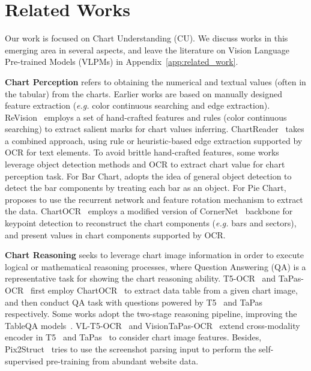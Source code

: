 \documentclass{article} \usepackage{iclr2024_conference,times}
\begin{document}
\vspace{-8pt}
\section{Related Works}
\vspace{-8pt}
Our work is focused on Chart Understanding (CU). We discuss works in this emerging area in several aspects, and leave the literature on Vision Language Pre-trained Models (VLPMs) in Appendix~\ref{app:related_work}.  

\textbf{Chart Perception} refers to obtaining the numerical and textual values (often in the tabular) from the charts. Earlier works are based on manually designed feature extraction (\textit{e.g.} color continuous searching and edge extraction). ReVision~\citep{Savva2011ReVisionAC} employs a set of hand-crafted features and rules (color continuous searching) to extract salient marks for chart values inferring. ChartReader~\citep{Rane2021ChartReaderAP} takes a combined approach, using rule or heuristic-based edge extraction supported by OCR for text elements. To avoid brittle hand-crafted features, some works leverage object detection methods and OCR to extract chart value for chart perception task. For Bar Chart, \citep{Choi2019VisualizingFT} adopts the idea of general object detection to detect the bar components by treating each bar as an object. For Pie Chart, \citep{Liu2019DataEF} proposes to use the recurrent network and feature rotation mechanism to extract the data. ChartOCR~\citep{Luo2021ChartOCRDE} employs a modified version of CornerNet~\citep{Law2018CornerNetDO} backbone for keypoint detection to reconstruct the chart components (\textit{e.g.} bars and sectors), and present values in chart components supported by OCR.

\textbf{Chart Reasoning} seeks to leverage chart image information in order to execute logical or mathematical reasoning processes, where Question Answering (QA) is a representative task for showing the chart reasoning ability. 
T5-OCR~\citep{Masry2022ChartQAAB} and TaPas-OCR~\citep{Masry2022ChartQAAB} first employ ChartOCR~\citep{Luo2021ChartOCRDE} to extract data table from a given chart image, and then conduct QA task with questions powered by T5~\citep{Nan2021FeTaQAFT} and TaPas~\citep{Herzig2020TaPasWS} respectively. Some works adopt the two-stage reasoning pipeline, improving the TableQA models~\citep{pasupat2015compositional}. VL-T5-OCR~\citep{Masry2022ChartQAAB} and VisionTaPas-OCR~\citep{Masry2022ChartQAAB} extend cross-modality encoder in T5~\citep{raffel2020exploring} and TaPas~\citep{Herzig2020TaPasWS} to consider chart image features. Besides, Pix2Struct~\citep{Lee2022Pix2StructSP} tries to use the screenshot parsing input to perform the self-supervised pre-training from abundant website data.
\end{document}
